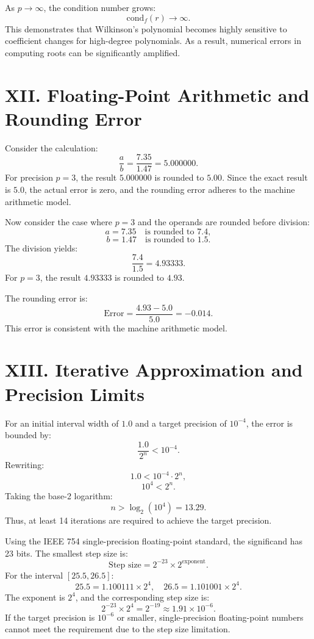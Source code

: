 \documentclass{article}
\begin{document}
As \( p \to \infty \), the condition number grows:
\[
\text{cond}_f(r) \to \infty.
\]
This demonstrates that Wilkinson's polynomial becomes highly sensitive to coefficient changes for high-degree polynomials. As a result, numerical errors in computing roots can be significantly amplified.


\section{XII. Floating-Point Arithmetic and Rounding Error}
Consider the calculation:
\[
\frac{a}{b} = \frac{7.35}{1.47} = 5.000000.
\]
For precision \( p = 3 \), the result \( 5.000000 \) is rounded to \( 5.00 \). Since the exact result is \( 5.0 \), the actual error is zero, and the rounding error adheres to the machine arithmetic model.

Now consider the case where \( p = 3 \) and the operands are rounded before division:
\[
a = 7.35 \quad \text{is rounded to } 7.4,
\]
\[
b = 1.47 \quad \text{is rounded to } 1.5.
\]
The division yields:
\[
\frac{7.4}{1.5} = 4.93333.
\]
For \( p = 3 \), the result \( 4.93333 \) is rounded to \( 4.93 \).

The rounding error is:
\[
\text{Error} = \frac{4.93 - 5.0}{5.0} = -0.014.
\]
This error is consistent with the machine arithmetic model.



\section{XIII. Iterative Approximation and Precision Limits}
For an initial interval width of \( 1.0 \) and a target precision of \( 10^{-4} \), the error is bounded by:
\[
\frac{1.0}{2^n} < 10^{-4}.
\]
Rewriting:
\[
1.0 < 10^{-4} \cdot 2^n,
\]
\[
10^4 < 2^n.
\]
Taking the base-2 logarithm:
\[
n > \log_2(10^4) = 13.29.
\]
Thus, at least 14 iterations are required to achieve the target precision.

Using the IEEE 754 single-precision floating-point standard, the significand has 23 bits. The smallest step size is:
\[
\text{Step size} = 2^{-23} \times 2^{\text{exponent}}.
\]
For the interval \([25.5, 26.5]\):
\[
25.5 = 1.100111 \times 2^4, \quad 26.5 = 1.101001 \times 2^4.
\]
The exponent is \( 2^4 \), and the corresponding step size is:
\[
2^{-23} \times 2^4 = 2^{-19} \approx 1.91 \times 10^{-6}.
\]
If the target precision is \( 10^{-6} \) or smaller, single-precision floating-point numbers cannot meet the requirement due to the step size limitation.
\end{document}
